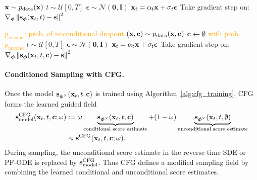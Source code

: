 \begin{center}
\begin{minipage}[t]{0.48\textwidth}
  \begin{algorithm}[H]
  {\small
    {\small \caption{Uncond. DM \label{alg:no_cfg_training} }}
    \begin{algorithmic}[1]
      \Repeat
        \State ${\mathbf{x}} \sim p_{\text{data}}({\mathbf{x}})$
        \State $t \sim \mathcal{U}[0, T]$
        \State $\bm{\epsilon} \sim \mathcal{N}(\mathbf{0}, \mathbf{I})$
        \State ${\mathbf{x}}_t = \alpha_t {\mathbf{x}} + \sigma_t \bm{\epsilon}$
        \State Take gradient step on:
        \Statex \quad $\nabla_{\bm{\phi}} \left\| {\mathbf{s}}_{\bm{\phi}}({\mathbf{x}}_t, t) - {\mathbf{s}} \right\|^2$
    \end{algorithmic}
    }
  \end{algorithm}
\end{minipage}
\hfill
\begin{minipage}[t]{0.48\textwidth}
  \begin{algorithm}[H]
      {\small
    {\small \caption{CFG for Cond. DM \label{alg:cfg_training}}}
    \begin{algorithmic}[1]
      \Require \textcolor{orange}{$p_\mathrm{uncond}$: prob. of unconditional dropout}
      \Repeat
        \State \textcolor{orange}{$({\mathbf{x}}, {\mathbf{c}}) \sim p_{\text{data}}({\mathbf{x}}, {\mathbf{c}})$}
        \State \textcolor{orange}{${\mathbf{c}} \gets \emptyset$ with prob. $p_\mathrm{uncond}$}
        \State $t \sim \mathcal{U}[0, T]$
        \State $\bm{\epsilon} \sim \mathcal{N}(\mathbf{0}, \mathbf{I})$
        \State ${\mathbf{x}}_t = \alpha_t {\mathbf{x}} + \sigma_t \bm{\epsilon}$
        \State Take gradient step on:
        \Statex \quad \textcolor{orange}{$\nabla_{\bm{\phi}} \left\| {\mathbf{s}}_{\bm{\phi}}({\mathbf{x}}_t, t, {\mathbf{c}}) - {\mathbf{s}} \right\|^2$}
    \end{algorithmic}
    }
  \end{algorithm}
\end{minipage}
\end{center}

\paragraph{Conditioned Sampling with CFG.}

Once the model ${\mathbf{s}}_{\bm{\phi}^\times}({\mathbf{x}}_t,t,{\mathbf{c}})$ is trained using
Algorithm~\ref{alg:cfg_training}, CFG forms the learned guided field
\begin{align}\label{eq:cfg-model-nn}
{\mathbf{s}}_{\mathrm{model}}^{\mathrm{CFG}}({\mathbf{x}}_t,t,{\mathbf{c}};\omega)
&:=
\omega
\underbrace{{\mathbf{s}}_{\bm{\phi}^\times}({\mathbf{x}}_t,t,{\mathbf{c}})}_{\text{conditional score estimate}}
+
(1-\omega)
\underbrace{{\mathbf{s}}_{\bm{\phi}^\times}({\mathbf{x}}_t,t,\emptyset)}_{\text{unconditional score estimate}}
\nonumber\\
&\approx
{\mathbf{s}}^{\mathrm{CFG}}({\mathbf{x}}_t,t,{\mathbf{c}};\omega).
\end{align}
During sampling, the unconditional score estimate in the reverse-time SDE or
PF-ODE is replaced by
${\mathbf{s}}_{\mathrm{model}}^{\mathrm{CFG}}$.
Thus CFG defines a modified sampling field by combining the learned
conditional and unconditional score estimates.


